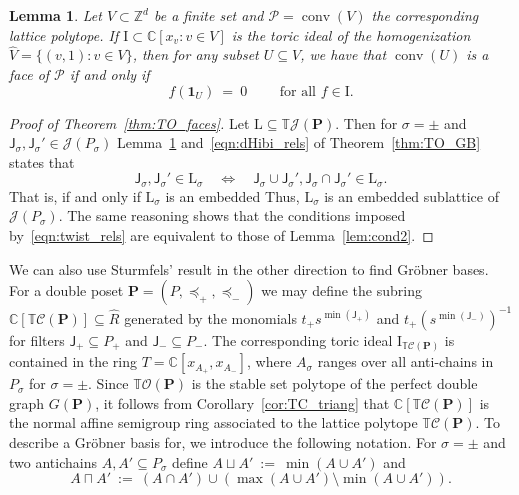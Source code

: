 \documentclass[11pt]{amsart}
\newtheorem{lem}[thm]{Lemma}
\theoremstyle{definition}
\begin{document}
\begin{lem}\label{lem:cone_orbit}
    Let $V \subset {\mathbb{Z}}^d$ be a finite set and ${\mathcal{P}} = \operatorname{conv}(V)$ the
    corresponding lattice polytope. If ${\mathrm{I}}\subset {\mathbb{C}}[ x_v : v \in V]$ is the
    toric ideal of the homogenization $\hat{V} = \{ (v,1) : v \in V \}$, then
    for any subset $U \subseteq V$, we have that $\operatorname{conv}(U)$ is a face of ${\mathcal{P}}$
    if and only if
    \[
        f({\mathbf{1}}_U) \ = \ 0 \qquad \text{ for all } f \in {\mathrm{I}}.
    \]
\end{lem}

\begin{proof}[Proof of Theorem~\ref{thm:TO_faces}]
    Let ${\mathrm{L}} \subseteq {{\mathbb{T}}{{\mathcal{J}}({{\mathbf{P}}})}}$. Then for $\sigma = \pm$ and
    ${\mathsf{J}}_\sigma, {\mathsf{J}}_\sigma' \in {{\mathcal{J}}({{P}_\sigma})}$
    Lemma~\ref{lem:cone_orbit} and~\eqref{eqn:dHibi_rels} of
    Theorem~\ref{thm:TO_GB} states that 
    \[
        {\mathsf{J}}_\sigma, {\mathsf{J}}_\sigma' \in {\mathrm{L}}_\sigma 
        \quad \Longleftrightarrow \quad
        {\mathsf{J}}_\sigma \cup {\mathsf{J}}_\sigma', 
        {\mathsf{J}}_\sigma \cap  {\mathsf{J}}_\sigma' \in {\mathrm{L}}_\sigma.
    \]
    That is, if and only if ${\mathrm{L}}_\sigma$ is an embedded Thus, ${\mathrm{L}}_\sigma$ is an
    embedded sublattice of ${{\mathcal{J}}({{P}_\sigma})}$.  The same reasoning shows that
    the conditions imposed by~\eqref{eqn:twist_rels} are equivalent to those
    of Lemma~\ref{lem:cond2}.
\end{proof}

We can also use Sturmfels' result in the other direction to find Gr\"obner
bases. For a double poset ${\mathbf{P}} = ({P},\preceq_+,\preceq_-)$ we may define
the
subring ${{\mathbb{C}}[{{\mathbb{T}}{\mathcal{C}({{{{\mathbf{P}}}}})}}]} \subseteq \hat R$ generated by the monomials
$t_+ s^{\min({\mathsf{J}}_+)}$  and $t_+ (s^{\min({\mathsf{J}}_-)})^{-1}$ for filters
${\mathsf{J}}_+ \subseteq {P}_+$ and ${\mathsf{J}}_- \subseteq {P}_-$. The corresponding
toric ideal ${{\mathrm{I}}_{{{\mathbb{T}}{\mathcal{C}({{{\mathbf{P}}}})}}}}$ is contained in the ring $T = {\mathbb{C}}[ x_{A_+},
x_{A_-} ]$, where $A_\sigma$ ranges over all anti-chains in ${P}_\sigma$ for
$\sigma = \pm$.  Since ${{\mathbb{T}}{\mathcal{O}({\mathbf{P}})}}$ is the stable set polytope of the
perfect double graph $G({\mathbf{P}})$, it follows from
Corollary~\ref{cor:TC_triang} that ${{\mathbb{C}}[{{\mathbb{T}}{\mathcal{C}({{{{\mathbf{P}}}}})}}]}$ is the normal affine
semigroup ring associated to the lattice polytope ${{\mathbb{T}}{\mathcal{C}({{{\mathbf{P}}}})}}$. To
describe a Gr\"obner basis for, we introduce the following notation. For
$\sigma = \pm$ and two antichains $A,A' \subseteq {P}_\sigma$ define $A \sqcup A'
\ := \ \min(A \cup A')$ and 
\[
    A \sqcap A' \ := \ (A \cap A') \cup (\max(A \cup A') \setminus \min(A \cup
    A')).
\]
\end{document}
